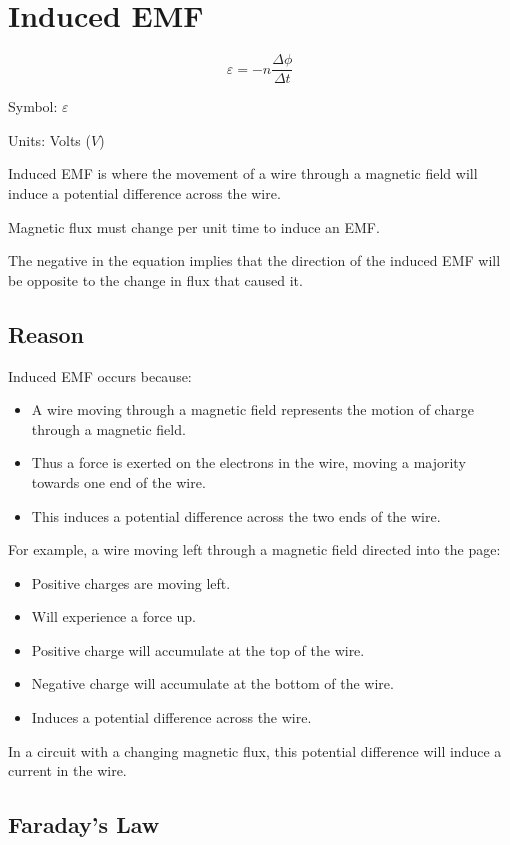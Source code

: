 \documentclass[a4paper,11pt]{report}
\begin{document}
\section{Induced EMF}

$$
\varepsilon = -n \frac{\Delta \phi}{\Delta t}
$$

Symbol: $\varepsilon$

Units: Volts ($V$)

Induced EMF is where the movement of a wire through a magnetic field will induce
a potential difference across the wire.

Magnetic flux must change per unit time to induce an EMF.

The negative in the equation implies that the direction of the induced EMF will
be opposite to the change in flux that caused it.

\subsection{Reason}

Induced EMF occurs because:

\begin{itemize}
\item A wire moving through a magnetic field represents the motion of charge
	through a magnetic field.
\item Thus a force is exerted on the electrons in the wire, moving a majority
	towards one end of the wire.
\item This induces a potential difference across the two ends of the wire.
\end{itemize}

For example, a wire moving left through a magnetic field directed into the
page:

\begin{itemize}
\item Positive charges are moving left.
\item Will experience a force up.
\item Positive charge will accumulate at the top of the wire.
\item Negative charge will accumulate at the bottom of the wire.
\item Induces a potential difference across the wire.
\end{itemize}

In a circuit with a changing magnetic flux, this potential difference will
induce a current in the wire.

\subsection{Faraday's Law}
\end{document}
